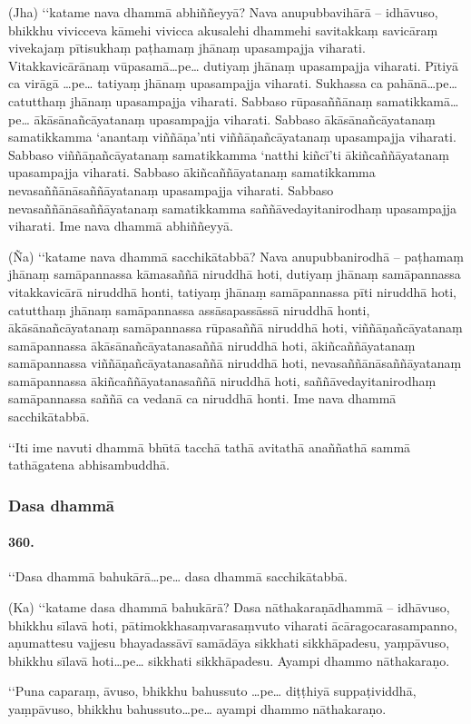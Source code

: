 (Jha) ‘‘katame nava dhammā abhiññeyyā? Nava anupubbavihārā – idhāvuso, bhikkhu vivicceva kāmehi vivicca akusalehi dhammehi savitakkaṃ savicāraṃ vivekajaṃ pītisukhaṃ paṭhamaṃ jhānaṃ upasampajja viharati. Vitakkavicārānaṃ vūpasamā…pe… dutiyaṃ jhānaṃ upasampajja viharati. Pītiyā ca virāgā …pe… tatiyaṃ jhānaṃ upasampajja viharati. Sukhassa ca pahānā…pe… catutthaṃ jhānaṃ upasampajja viharati. Sabbaso rūpasaññānaṃ samatikkamā…pe… ākāsānañcāyatanaṃ upasampajja viharati. Sabbaso ākāsānañcāyatanaṃ samatikkamma ‘anantaṃ viññāṇa’nti viññāṇañcāyatanaṃ upasampajja viharati. Sabbaso viññāṇañcāyatanaṃ samatikkamma ‘natthi kiñcī’ti ākiñcaññāyatanaṃ upasampajja viharati. Sabbaso ākiñcaññāyatanaṃ samatikkamma nevasaññānāsaññāyatanaṃ upasampajja viharati. Sabbaso nevasaññānāsaññāyatanaṃ samatikkamma saññāvedayitanirodhaṃ upasampajja viharati. Ime nava dhammā abhiññeyyā.

(Ña) ‘‘katame nava dhammā sacchikātabbā? Nava anupubbanirodhā – paṭhamaṃ jhānaṃ samāpannassa kāmasaññā niruddhā hoti, dutiyaṃ jhānaṃ samāpannassa vitakkavicārā niruddhā honti, tatiyaṃ jhānaṃ samāpannassa pīti niruddhā hoti, catutthaṃ jhānaṃ samāpannassa assāsapassāssā niruddhā honti, ākāsānañcāyatanaṃ samāpannassa rūpasaññā niruddhā hoti, viññāṇañcāyatanaṃ samāpannassa ākāsānañcāyatanasaññā niruddhā hoti, ākiñcaññāyatanaṃ samāpannassa viññāṇañcāyatanasaññā niruddhā hoti, nevasaññānāsaññāyatanaṃ samāpannassa ākiñcaññāyatanasaññā niruddhā hoti, saññāvedayitanirodhaṃ samāpannassa saññā ca vedanā ca niruddhā honti. Ime nava dhammā sacchikātabbā.

‘‘Iti ime navuti dhammā bhūtā tacchā tathā avitathā anaññathā sammā tathāgatena abhisambuddhā.

\subsubsection{Dasa dhammā}

\paragraph{360.} ‘‘Dasa dhammā bahukārā…pe… dasa dhammā sacchikātabbā.

(Ka) ‘‘katame dasa dhammā bahukārā? Dasa nāthakaraṇādhammā – idhāvuso, bhikkhu sīlavā hoti, pātimokkhasaṃvarasaṃvuto viharati ācāragocarasampanno, aṇumattesu vajjesu bhayadassāvī samādāya sikkhati sikkhāpadesu, yaṃpāvuso, bhikkhu sīlavā hoti…pe… sikkhati sikkhāpadesu. Ayampi dhammo nāthakaraṇo.

‘‘Puna caparaṃ, āvuso, bhikkhu bahussuto …pe… diṭṭhiyā suppaṭividdhā, yaṃpāvuso, bhikkhu bahussuto…pe… ayampi dhammo nāthakaraṇo.

